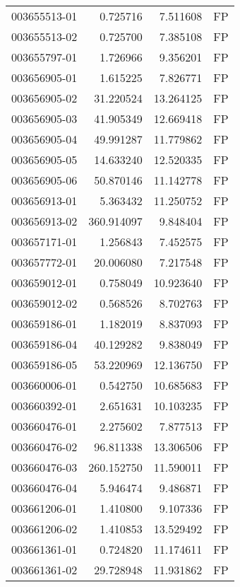 \begin{tabular}{lrrl}
003655513-01 &    0.725716 &       7.511608 &   FP \\
003655513-02 &    0.725700 &       7.385108 &   FP \\
003655797-01 &    1.726966 &       9.356201 &   FP \\
003656905-01 &    1.615225 &       7.826771 &   FP \\
003656905-02 &   31.220524 &      13.264125 &   FP \\
003656905-03 &   41.905349 &      12.669418 &   FP \\
003656905-04 &   49.991287 &      11.779862 &   FP \\
003656905-05 &   14.633240 &      12.520335 &   FP \\
003656905-06 &   50.870146 &      11.142778 &   FP \\
003656913-01 &    5.363432 &      11.250752 &   FP \\
003656913-02 &  360.914097 &       9.848404 &   FP \\
003657171-01 &    1.256843 &       7.452575 &   FP \\
003657772-01 &   20.006080 &       7.217548 &   FP \\
003659012-01 &    0.758049 &      10.923640 &   FP \\
003659012-02 &    0.568526 &       8.702763 &   FP \\
003659186-01 &    1.182019 &       8.837093 &   FP \\
003659186-04 &   40.129282 &       9.838049 &   FP \\
003659186-05 &   53.220969 &      12.136750 &   FP \\
003660006-01 &    0.542750 &      10.685683 &   FP \\
003660392-01 &    2.651631 &      10.103235 &   FP \\
003660476-01 &    2.275602 &       7.877513 &   FP \\
003660476-02 &   96.811338 &      13.306506 &   FP \\
003660476-03 &  260.152750 &      11.590011 &   FP \\
003660476-04 &    5.946474 &       9.486871 &   FP \\
003661206-01 &    1.410800 &       9.107336 &   FP \\
003661206-02 &    1.410853 &      13.529492 &   FP \\
003661361-01 &    0.724820 &      11.174611 &   FP \\
003661361-02 &   29.728948 &      11.931862 &   FP \\

\end{tabular}
